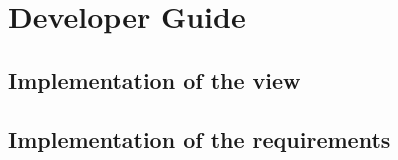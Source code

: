 \chapter{Developer Guide}\label{ch:developer_guide} %

\section{Implementation of the view}
\label{sec:implementation_view}

\section{Implementation of the requirements}
\label{sec:implementation_requirements}